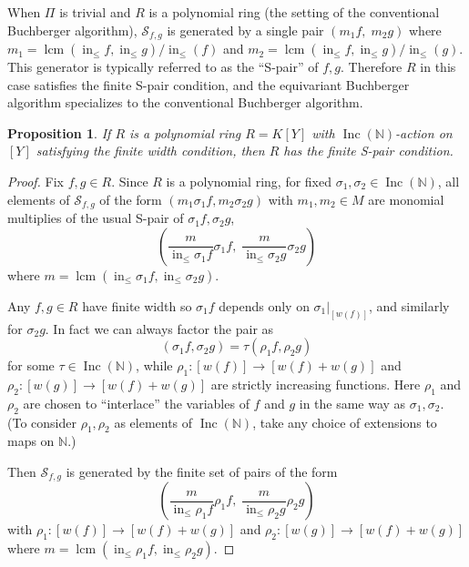 \documentclass{amsart}
\newtheorem{proposition}[theorem]{Proposition}
\theoremstyle{definition}
\theoremstyle{remark}
\numberwithin{equation}{section}
\newcommand{\B}[1]{\mathbb #1}
\newcommand{\C}[1]{\mathcal #1}
\DeclareMathOperator{\initial}{in}
\DeclareMathOperator{\lcm}{lcm}
\newcommand{\Inc}{\operatorname{Inc}(\B N)}
\newcommand{\mon}{M}
\newcommand{\LT}{\initial_{\leq}}
\begin{document}
When $\Pi$ is trivial and $R$ is a polynomial ring (the setting of the conventional Buchberger algorithm), $\C S_{f,g}$ is generated by a single pair $(m_1 f,\; m_2 g)$ where $m_1 = \lcm(\LT f, \LT g)/\LT(f)$ and $m_2 = \lcm(\LT f, \LT g)/\LT(g)$.  This generator is typically referred to as the ``S-pair'' of $f,g$.  Therefore $R$ in this case satisfies the finite S-pair condition, and the equivariant Buchberger algorithm specializes to the conventional Buchberger algorithm.

\begin{proposition}
 If $R$ is a polynomial ring $R = K[Y]$ with $\Inc$-action on $[Y]$ satisfying the finite width condition, then $R$ has the finite S-pair condition.
\end{proposition}
\begin{proof}
 Fix $f,g \in R$.
 Since $R$ is a polynomial ring, for fixed $\sigma_1,\sigma_2 \in \Inc$, all elements of $\C S_{f,g}$ of the form $(m_1\sigma_1 f, m_2\sigma_2 g)$ with $m_1,m_2 \in \mon$ are monomial multiplies of the usual S-pair of $\sigma_1 f, \sigma_2 g$,
  \[ \left(\frac{m}{\LT \sigma_1 f} \sigma_1 f,\; \frac{m}{\LT \sigma_2 g} \sigma_2 g\right) \]
 where $m = \lcm(\LT \sigma_1 f,\LT \sigma_2 g)$.

 Any $f,g \in R$ have finite width so $\sigma_1 f$ depends only on $\sigma_1|_{[w(f)]}$, and similarly for $\sigma_2 g$.  In fact we can always factor the pair as
  \[ (\sigma_1 f, \sigma_2 g) = \tau(\rho_1 f, \rho_2 g) \]
 for some $\tau \in \Inc$, while $\rho_1:[w(f)] \to [w(f) + w(g)]$ and $\rho_2:[w(g)] \to [w(f) + w(g)]$ are strictly increasing functions.  Here $\rho_1$ and $\rho_2$ are chosen to ``interlace'' the variables of $f$ and $g$ in the same way as $\sigma_1,\sigma_2$.  (To consider $\rho_1,\rho_2$ as elements of $\Inc$, take any choice of extensions to maps on $\B N$.)
 
 Then $\C S_{f,g}$ is generated by the finite set of pairs of the form
  \[ \left(\frac{m}{\LT \rho_1 f} \rho_1 f,\; \frac{m}{\LT \rho_2 g} \rho_2 g\right) \]
 with $\rho_1:[w(f)] \to [w(f) + w(g)]$ and $\rho_2:[w(g)] \to [w(f) + w(g)]$ where $m = \lcm(\LT \rho_1 f,\LT \rho_2 g)$.
\end{proof}

\end{document}
